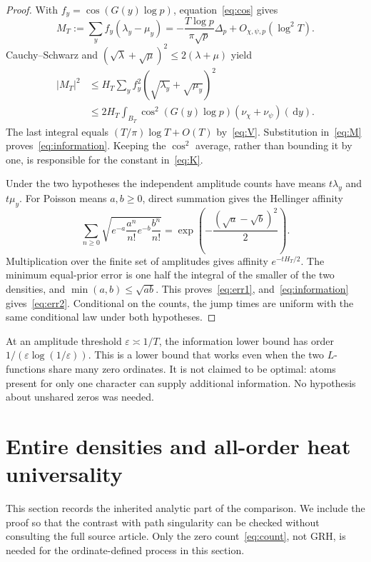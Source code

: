 \documentclass[11pt]{article}
\theoremstyle{definition}
\newcommand{\dd}{\,\mathrm d}
\newcommand{\abs}[1]{\left|#1\right|}
\begin{document}
\begin{proof}
With $f_y=\cos(G(y)\log p)$, equation~\eqref{eq:cos} gives
\begin{equation}\label{eq:M}
 M_T:=\sum_yf_y(\lambda_y-\mu_y)
 =-\frac{T\log p}{\pi\sqrt p}\Delta_p+O_{\chi,\psi,p}(\log^2 T).
\end{equation}
Cauchy--Schwarz and $(\sqrt\lambda+\sqrt\mu)^2\le2(\lambda+\mu)$ yield
\begin{align*}
 \abs{M_T}^2
 &\le H_T\sum_y f_y^2(\sqrt{\lambda_y}+\sqrt{\mu_y})^2\\
 &\le2H_T\int_{B_T}\cos^2(G(y)\log p)
                              (\nu_\chi+\nu_\psi)(\dd y).
\end{align*}
The last integral equals $(T/\pi)\log T+O(T)$ by~\eqref{eq:V}.
Substitution in~\eqref{eq:M} proves~\eqref{eq:information}. Keeping the
$\cos^2$ average, rather than bounding it by one, is responsible for the
constant in~\eqref{eq:K}.

Under the two hypotheses the independent amplitude counts have means
$t\lambda_y$ and $t\mu_y$. For Poisson means $a,b\ge0$, direct summation gives
the Hellinger affinity
\[
 \sum_{n\ge0}\sqrt{e^{-a}\frac{a^n}{n!}
                         e^{-b}\frac{b^n}{n!}}
     =\exp\left(-\frac{(\sqrt a-\sqrt b)^2}{2}\right).
\]
Multiplication over the finite set of amplitudes gives affinity $e^{-tH_T/2}$.
The minimum equal-prior error is one half the integral of the smaller of the
two densities, and $\min(a,b)\le\sqrt{ab}$. This proves~\eqref{eq:err1},
and~\eqref{eq:information} gives~\eqref{eq:err2}. Conditional on the counts,
the jump times are uniform with the same conditional law under both hypotheses.
\end{proof}

At an amplitude threshold $\varepsilon\asymp1/T$, the information lower
bound has order $1/(\varepsilon\log(1/\varepsilon))$. This is a lower bound
that works even when the two $L$-functions share many zero ordinates.
It is not claimed to be optimal: atoms present for only one character can
supply additional information. No hypothesis about unshared zeros was needed.

\section{Entire densities and all-order heat universality}
\label{sec:heat}

This section records the inherited analytic part of the comparison. We include
the proof so that the contrast with path singularity can be checked without
consulting the full source article. Only the zero count~\eqref{eq:count}, not
GRH, is needed for the ordinate-defined process in this section.
\end{document}
